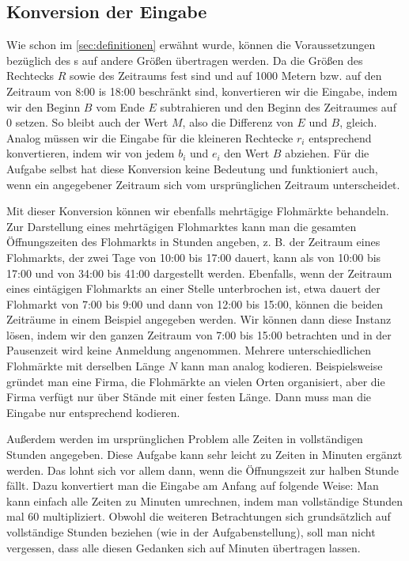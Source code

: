 \subsection{Konversion der Eingabe}
Wie schon im \cref{sec:definitionen} erwähnt wurde, können die Voraussetzungen bezüglich des
\fp s auf andere Größen übertragen werden. Da die Größen des Rechtecks $R$ sowie des Zeitraums fest sind
und auf 1000 Metern bzw. auf den Zeitraum von 8:00 is 18:00 beschränkt sind, konvertieren wir
die Eingabe, indem wir den 
Beginn $B$ vom Ende $E$ subtrahieren und den Beginn des Zeitraumes auf 0 setzen.
So bleibt auch der Wert $M$, also die Differenz von $E$ und $B$, gleich. 
Analog müssen wir die Eingabe für die kleineren Rechtecke $r_i$ entsprechend konvertieren, indem wir
von jedem $b_i$ und $e_i$ den Wert $B$ abziehen. Für die Aufgabe selbst hat diese Konversion keine
Bedeutung und funktioniert auch, wenn ein angegebener Zeitraum sich vom ursprünglichen Zeitraum unterscheidet.

Mit dieser Konversion können wir ebenfalls mehrtägige Flohmärkte behandeln.
Zur Darstellung eines mehrtägigen Flohmarktes kann man die gesamten Öffnungszeiten des Flohmarkts in Stunden angeben,
z. B. der Zeitraum eines Flohmarkts, der zwei Tage von 10:00 bis 17:00 dauert,
kann als von 10:00 bis 17:00 und von 34:00 bis 41:00 dargestellt werden. 
Ebenfalls, wenn der Zeitraum eines eintägigen Flohmarkts an einer Stelle unterbrochen ist,
etwa dauert der Flohmarkt von 7:00 bis 9:00 und dann von 12:00 bis 15:00, können die 
beiden Zeiträume in einem Beispiel angegeben werden. Wir können dann diese Instanz lösen,
indem wir den ganzen Zeitraum von 7:00 bis 15:00 betrachten und in der Pausenzeit
wird keine Anmeldung angenommen.
Mehrere unterschiedlichen Flohmärkte mit derselben Länge $N$ kann man analog kodieren.
Beispielsweise gründet man eine Firma, die Flohmärkte an vielen Orten organisiert, aber
die Firma verfügt nur über Stände mit einer festen Länge. Dann muss man die Eingabe nur
entsprechend kodieren.


Außerdem werden im ursprünglichen Problem alle Zeiten in vollständigen Stunden angegeben.
Diese Aufgabe kann sehr leicht zu Zeiten in Minuten ergänzt werden.
Das lohnt sich vor allem dann, wenn die Öffnungszeit zur halben Stunde fällt.
Dazu konvertiert man die Eingabe
am Anfang auf folgende Weise: Man kann einfach alle Zeiten zu Minuten umrechnen, indem
man vollständige Stunden mal 60 multipliziert.
Obwohl die weiteren Betrachtungen sich grundsätzlich auf vollständige Stunden beziehen
(wie in der Aufgabenstellung),
soll man nicht vergessen, dass alle diesen Gedanken sich auf Minuten übertragen lassen.